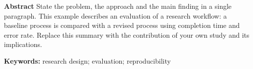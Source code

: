 \textbf{Abstract}\quad
State the problem, the approach and the main finding in a single paragraph.
This example describes an evaluation of a research workflow: a baseline process
is compared with a revised process using completion time and error rate.
Replace this summary with the contribution of your own study and its implications.

{\small\textbf{Keywords:} research design; evaluation; reproducibility}
